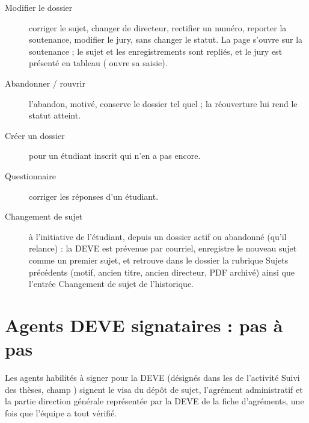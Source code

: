 \documentclass[11pt,a4paper]{article}
\begin{document}
\begin{description}
  \item[Modifier le dossier] corriger le sujet, changer de directeur, rectifier
        un numéro, reporter la soutenance, modifier le jury, sans changer le
        statut. La page s'ouvre sur la soutenance ; le sujet et les
        enregistrements sont repliés, et le jury est présenté en tableau
        ( ouvre sa saisie).
  \item[Abandonner / rouvrir] l'abandon, motivé, conserve le dossier tel quel ;
        la réouverture lui rend le statut atteint.
  \item[Créer un dossier] pour un étudiant inscrit qui n'en a pas encore.
  \item[Questionnaire] corriger les réponses d'un étudiant.
  \item[Changement de sujet] à l'initiative de l'étudiant, depuis un dossier
        actif ou abandonné (qu'il relance) : la DEVE est prévenue par courriel, enregistre le nouveau sujet
        comme un premier sujet, et retrouve dans le dossier la rubrique
        \og Sujets précédents\fg{} (motif, ancien titre, ancien directeur, PDF
        archivé) ainsi que l'entrée \og Changement de sujet\fg{} de
        l'historique.
\end{description}




\section{Agents DEVE signataires : pas à pas}\label{sec:agent}

Les agents habilités à signer pour la DEVE (désignés dans les
 de l'activité \og Suivi des thèses\fg{}, champ
) signent le visa du dépôt de sujet, l'agrément
administratif et la partie \og direction générale représentée par la DEVE\fg{}
de la fiche d'agréments, une fois que l'équipe a tout vérifié.
\end{document}
